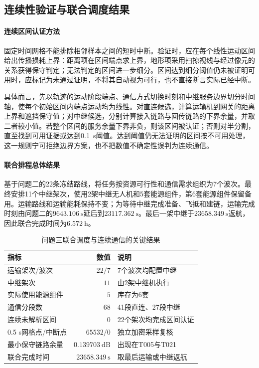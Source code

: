 \subsection{连续性验证与联合调度结果}
\paragraph{连续区间认证方法}
固定时间网格不能排除相邻样本之间的短时中断。验证时，应在每个线性运动区间给出传播损耗上界：距离项在区间端点求上界，地形项采用扫掠视线与经过像元的关系获得保守判定；无法判定的区间进一步细分。区间达到细分阈值仍未被证明可用时，应标记为未通过证明，不将其自动视为可行，也不直接断言实际已经中断。

具体而言，先以轨迹的运动阶段端点、通信方式切换时刻和中继服务边界切分时间轴，使每个初始区间内端点运动均为线性。对直连候选，计算运输机到网关的距离上界和遮挡保守值；对中继候选，分别计算接入链路与回传链路的下界余量，并取二者较小值。若整个区间的服务余量下界非负，则该区间被认证；否则对半分割，直至找到可用证据或达到0.1~s阈值。达到阈值仍无法证明的区间按不可用处理，这一规则宁可拒绝边界方案，也不把数值不确定性误判为连续通信。

\paragraph{联合排程总体结果}
基于问题二的22条冻结路线，将任务按资源可行性和通信需求组织为7个波次。最终安排11个中继架次，使用2架中继无人机和5套能源组件，第6套能源组件保留备用。运输路线和运输能耗保持不变；为等待中继完成准备、飞抵和建链，运输完成时刻由问题二的$9643.106\ \mathrm{s}$延后到$23117.362\ \mathrm{s}$。最后一架中继于$23658.349\ \mathrm{s}$返航，因此联合完成时间为$6.572\ \mathrm{h}$。

\begin{table}[htbp]
  \centering
  \caption{问题三联合调度与连续通信的关键结果}
  \label{tab:q3-summary}
  \begin{tabular}{lrl}
    \toprule
    指标 & 数值 & 说明 \\
    \midrule
    运输架次/波次 & $22/7$ & 7个波次均配置中继 \\
    中继架次 & $11$ & 由2架中继机执行 \\
    实际使用能源组件 & $5$ & 库存为6套 \\
    通信分段数 & $68$ & 41段直连、27段中继 \\
    连续未解析区间 & $0$ & 22个架次均完成区间认证 \\
    0.5 s网格点/中断点 & $65532/0$ & 独立加密采样复核 \\
    最小保守链路余量 & $0.139703\ \mathrm{dB}$ & 出现在T005与T021 \\
    联合完成时间 & $23658.349\ \mathrm{s}$ & 取最后运输或中继返航 \\
    \bottomrule
  \end{tabular}
\end{table}

